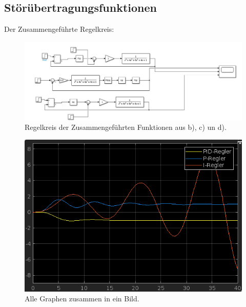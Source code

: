 \documentclass{article}
\begin{document}
		\subsection{Störübertragungsfunktionen}
			Der Zusammengeführte Regelkreis:
			\begin{figure}[h]
				\includegraphics[scale = 0.4, center]{4_d_Blockschaltbild_alle_zusammen.png}
				\caption{Regelkreis der Zusammengeführten Funktionen aus b), c) un d).}
				\label{fig37:4_d_alle_Regelkreise}
			\end{figure}
			\begin{figure}[h]
				\includegraphics[scale = 0.45, center]{4_d_alle_Graphen.png}
				\caption{Alle Graphen zusammen in ein Bild.}
				\label{fig37:4_d_alle_Regelkreise}
			\end{figure}
				
				
				
				
				
\end{document}
